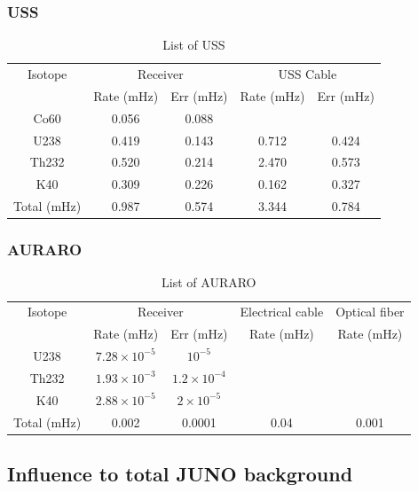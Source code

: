 \documentclass[review,number,sort&compress]{elsarticle}
\begin{document}
\subsubsection{USS}

\begin{table}[h]
	\centering
	\caption{List of USS}
	\renewcommand\tabcolsep{2mm} 
	\begin{tabular*}{110mm}{c|cc|cc}
		\hline
		Isotope	&\multicolumn{2}{c|}{Receiver}	&\multicolumn{2}{c}{USS Cable} \\
				& 	Rate (mHz)	&	Err (mHz)	& 	Rate (mHz)	&	Err (mHz)\\
		\hline
		Co60	& 	0.056		&	0.088	 	& 			&		 \\ 
		U238 	&   0.419		&	0.143	 	&	0.712	  &      0.424 \\
		Th232	&	0.520		&	0.214	 	&	2.470	  &      0.573 \\
		K40		& 	0.309		&	0.226	 	&	0.162	  &      0.327 \\
	Total (mHz)	&	0.987		&	0.574	 	&	3.344	  &      0.784 \\
		\hline
	\end{tabular*}
\end{table}


\subsubsection{AURARO}

\begin{table}[h]
	\centering
	\caption{List of AURARO}
	\renewcommand\tabcolsep{2mm} 
	\begin{tabular*}{120mm}{c|cc|c|c}
		\hline
		Isotope	&\multicolumn{2}{c|}{Receiver}	& Electrical cable & Optical fiber\\
				& 	Rate (mHz)	&	Err (mHz)	& Rate (mHz)&	Rate (mHz)\\
		\hline
		U238 	&   $7.28\times10^{-5}$		&$10^{-5}$		 	&	  		&   	\\
		Th232	&	$1.93\times10^{-3}$	&	$1.2\times10^{-4}$	 	&	  		&   	\\
		K40		& 	$2.88\times10^{-5}$		&	$2\times10^{-5}$	 	&	  		&   	\\
	Total (mHz)	&	0.002		&	0.0001	 	&	0.04  	& 0.001 \\
		\hline
	\end{tabular*}
\end{table}

\subsection{Influence to total JUNO background}
\end{document}
